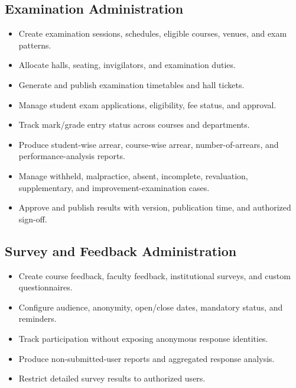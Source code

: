 \documentclass[10pt,a4paper]{article}
\begin{document}
\subsection{Examination Administration}
\begin{itemize}
  \item Create examination sessions, schedules, eligible courses, venues, and exam patterns.
  \item Allocate halls, seating, invigilators, and examination duties.
  \item Generate and publish examination timetables and hall tickets.
  \item Manage student exam applications, eligibility, fee status, and approval.
  \item Track mark/grade entry status across courses and departments.
  \item Produce student-wise arrear, course-wise arrear, number-of-arrears,
        and performance-analysis reports.
  \item Manage withheld, malpractice, absent, incomplete, revaluation, supplementary,
        and improvement-examination cases.
  \item Approve and publish results with version, publication time, and authorized sign-off.
\end{itemize}

\subsection{Survey and Feedback Administration}
\begin{itemize}
  \item Create course feedback, faculty feedback, institutional surveys, and custom questionnaires.
  \item Configure audience, anonymity, open/close dates, mandatory status, and reminders.
  \item Track participation without exposing anonymous response identities.
  \item Produce non-submitted-user reports and aggregated response analysis.
  \item Restrict detailed survey results to authorized users.
\end{itemize}
\end{document}
